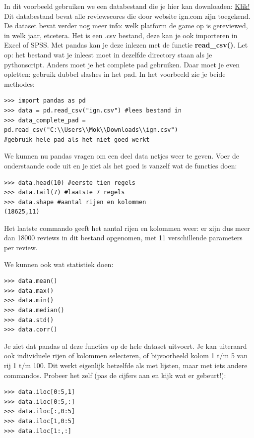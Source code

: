 In dit voorbeeld gebruiken we een databestand die je hier kan downloaden: \href{http://www.sharecsv.com/s/3397aa3f9cf0cf20ae6c1428a32bfc07/ign.csv}{Klik!} 
Dit databestand bevat alle reviewscores die door website ign.com zijn toegekend. De dataset bevat verder nog meer info: welk platform de game op is gereviewed, in welk jaar, etcetera. Het is een .csv bestand, deze kan je ook importeren in Excel of SPSS. Met pandas kan je deze inlezen met de functie \textbf{read\_csv()}. Let op: het bestand wat je inleest moet in dezelfde directory staan als je pythonscript. Anders moet je het complete pad gebruiken. Daar moet je even opletten: gebruik dubbel slashes in het pad. In het voorbeeld zie je beide methodes:
\begin{lstlisting}[frame=single]
>>> import pandas as pd
>>> data = pd.read_csv("ign.csv") #lees bestand in
>>> data_complete_pad = pd.read_csv("C:\\Users\\Mok\\Downloads\\ign.csv") 
#gebruik hele pad als het niet goed werkt
\end{lstlisting}

We kunnen nu pandas vragen om een deel data netjes weer te geven. Voer de onderstaande code uit en je ziet als het goed is vanzelf wat de functies doen:
\begin{lstlisting}[frame=single]
>>> data.head(10) #eerste tien regels
>>> data.tail(7) #laatste 7 regels
>>> data.shape #aantal rijen en kolommen
(18625,11)
\end{lstlisting}

Het laatste commando geeft het aantal rijen en kolommen weer: er zijn dus meer dan 18000 reviews in dit bestand opgenomen, met 11 verschillende parameters per review. 

We kunnen ook wat statistiek doen:
\begin{lstlisting}[frame=single]
>>> data.mean()
>>> data.max()
>>> data.min()
>>> data.median()
>>> data.std()
>>> data.corr()
\end{lstlisting}

Je ziet dat pandas al deze functies op de hele dataset uitvoert. Je kan uiteraard ook individuele rijen of kolommen selecteren, of bijvoorbeeld kolom 1 t/m 5 van rij 1 t/m 100. Dit werkt eigenlijk hetzelfde als met lijsten, maar met iets andere commandos. Probeer het zelf (pas de cijfers aan en kijk wat er gebeurt!):
\begin{lstlisting}[frame=single]
>>> data.iloc[0:5,1]
>>> data.iloc[0:5,:]
>>> data.iloc[:,0:5]
>>> data.iloc[1,0:5]
>>> data.iloc[1:,:]
\end{lstlisting}

